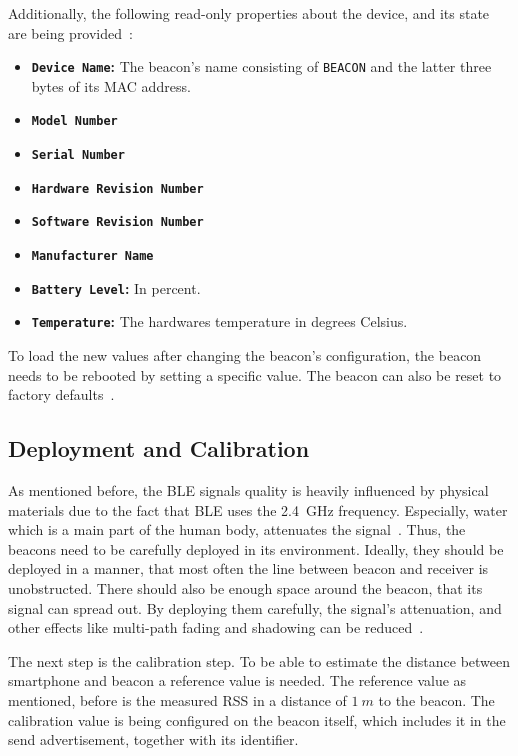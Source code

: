  Additionally, the following read-only properties about the device, and its state are being provided~\citep{binside:ds}:
\begin{itemize}
  \item \textbf{\texttt{Device Name}:} The beacon's name consisting of \texttt{BEACON} and the latter three bytes of its \acs{MAC} address.
  \item \textbf{\texttt{Model Number}}
  \item \textbf{\texttt{Serial Number}}
  \item \textbf{\texttt{Hardware Revision Number}}
  \item \textbf{\texttt{Software Revision Number}}
  \item \textbf{\texttt{Manufacturer Name}}
  \item \textbf{\texttt{Battery Level}:} In percent.
  \item \textbf{\texttt{Temperature}:} The hardwares temperature in degrees Celsius.
\end{itemize}

To load the new values after changing the beacon's configuration, the beacon needs to be rebooted by setting a specific value. The beacon can also be reset to factory defaults~\citep{binside:ds}.

\subsection{Deployment and Calibration}
As mentioned before, the \ac{BLE} signals quality is heavily influenced by physical materials due to the fact that \ac{BLE} uses the 2.4~GHz frequency. Especially, water which is a main part of the human body, attenuates the signal~\citep{apple:getting_started}. Thus, the beacons need to be carefully deployed in its environment. Ideally, they should be deployed in a manner, that most often the line between beacon and receiver is unobstructed. There should also be enough space around the beacon, that its signal can spread out. By deploying them carefully, the signal's attenuation, and other effects like multi-path fading and shadowing can be reduced~\citep{apple:getting_started,IEEE:survey_wireless_indoor_pos}.

The next step is the calibration step. To be able to estimate the distance between smartphone and beacon a reference value is needed. The reference value as mentioned, before is the measured \ac{RSS} in a distance of $1~m$ to the beacon. The calibration value is being configured on the beacon itself, which includes it in the send advertisement, together with its identifier.

